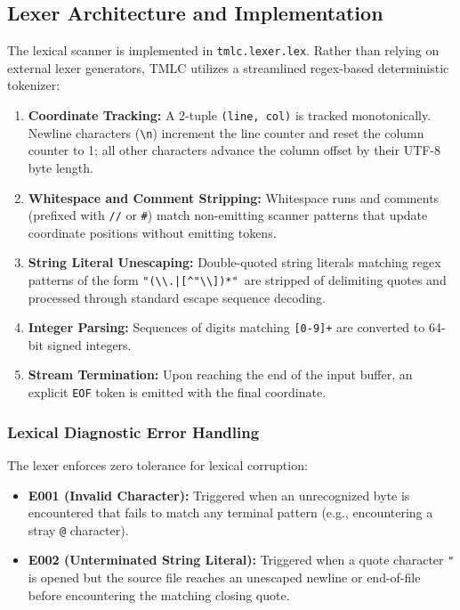 \documentclass[11pt,a4paper]{article}
\begin{document}
\subsection{Lexer Architecture and Implementation}
The lexical scanner is implemented in \texttt{tmlc.lexer.lex}. Rather than relying on external lexer generators, TMLC utilizes a streamlined regex-based deterministic tokenizer:
\begin{enumerate}
    \item \textbf{Coordinate Tracking:} A 2-tuple \texttt{(line, col)} is tracked monotonically. Newline characters (\texttt{\textbackslash n}) increment the line counter and reset the column counter to 1; all other characters advance the column offset by their UTF-8 byte length.
    \item \textbf{Whitespace and Comment Stripping:} Whitespace runs and comments (prefixed with \texttt{//} or \texttt{\#}) match non-emitting scanner patterns that update coordinate positions without emitting tokens.
    \item \textbf{String Literal Unescaping:} Double-quoted string literals matching regex patterns of the form \texttt{"(\textbackslash\textbackslash.|[\textasciicircum"\textbackslash\textbackslash])*"}\ are stripped of delimiting quotes and processed through standard escape sequence decoding.
    \item \textbf{Integer Parsing:} Sequences of digits matching \texttt{[0-9]+} are converted to 64-bit signed integers.
    \item \textbf{Stream Termination:} Upon reaching the end of the input buffer, an explicit \texttt{EOF} token is emitted with the final coordinate.
\end{enumerate}

\subsubsection{Lexical Diagnostic Error Handling}
The lexer enforces zero tolerance for lexical corruption:
\begin{itemize}
    \item \textbf{E001 (Invalid Character):} Triggered when an unrecognized byte is encountered that fails to match any terminal pattern (e.g., encountering a stray \texttt{@} character).
    \item \textbf{E002 (Unterminated String Literal):} Triggered when a quote character \texttt{"} is opened but the source file reaches an unescaped newline or end-of-file before encountering the matching closing quote.
\end{itemize}
\end{document}
